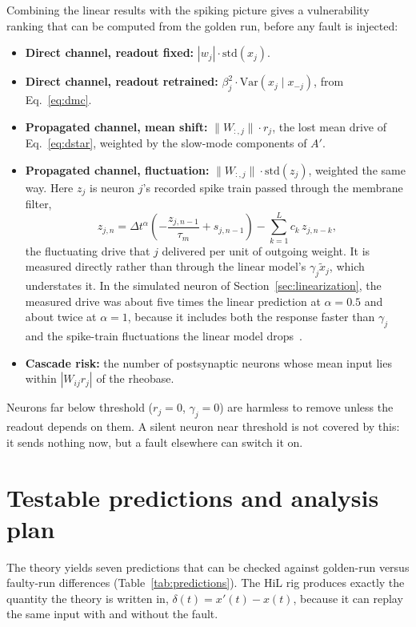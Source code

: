 \documentclass[11pt,a4paper]{article}
\newcommand{\Var}{\mathrm{Var}}
\newcommand{\xtil}{\tilde x}
\begin{document}
Combining the linear results with the spiking picture gives a vulnerability ranking that can be computed from the golden run, before any fault is injected:
\begin{itemize}
  \item \textbf{Direct channel, readout fixed:} $|w_j| \cdot \mathrm{std}(x_j)$.
  \item \textbf{Direct channel, readout retrained:} $\beta_j^2 \cdot \Var(x_j \mid x_{-j})$, from Eq.~\eqref{eq:dmc}.
  \item \textbf{Propagated channel, mean shift:} $\|W_{:,j}\| \cdot r_j$, the lost mean drive of Eq.~\eqref{eq:dstar}, weighted by the slow-mode components of $A'$.
  \item \textbf{Propagated channel, fluctuation:} $\|W_{:,j}\| \cdot \mathrm{std}(z_j)$, weighted the same way. Here $z_j$ is neuron $j$'s recorded spike train passed through the membrane filter,
  \[
  z_{j,n} = \Delta t^{\alpha}\left( -\frac{z_{j,n-1}}{\tau_m} + s_{j,n-1} \right) - \sum_{k=1}^{L} c_k\, z_{j,n-k},
  \]
  the fluctuating drive that $j$ delivered per unit of outgoing weight. It is measured directly rather than through the linear model's $\gamma_j \xtil_j$, which understates it. In the simulated neuron of Section~\ref{sec:linearization}, the measured drive was about five times the linear prediction at $\alpha = 0.5$ and about twice at $\alpha = 1$, because it includes both the response faster than $\gamma_j$ and the spike-train fluctuations the linear model drops~\cite{linsupp}.
  \item \textbf{Cascade risk:} the number of postsynaptic neurons whose mean input lies within $|W_{ij} r_j|$ of the rheobase.
\end{itemize}
Neurons far below threshold ($r_j = 0$, $\gamma_j = 0$) are harmless to remove unless the readout depends on them. A silent neuron near threshold is not covered by this: it sends nothing now, but a fault elsewhere can switch it on.

\section{Testable predictions and analysis plan}

The theory yields seven predictions that can be checked against golden-run versus faulty-run differences (Table~\ref{tab:predictions}). The HiL rig produces exactly the quantity the theory is written in, $\delta(t) = x'(t) - x(t)$, because it can replay the same input with and without the fault.
\end{document}
